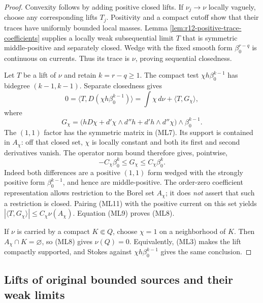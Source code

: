 \documentclass[11pt,a4paper]{article}
\numberwithin{equation}{section}
\theoremstyle{definition}
\theoremstyle{remark}
\begin{document}
\begin{proof}
Convexity follows by adding positive closed lifts.  If
$\nu_j\to\nu$ locally vaguely, choose any corresponding lifts
$T_j$.  Positivity and a compact cutoff show that their traces
have uniformly bounded local masses.  Lemma
\ref{lem:r12-positive-trace-coefficients} supplies a locally weak
subsequential limit $T$ that is symmetric middle-positive and
separately closed.  Wedge with the fixed smooth form
$\beta_0^{r-q}$ is continuous on currents.  Thus its trace is
$\nu$, proving sequential closedness.

Let $T$ be a lift of $\nu$ and retain $k=r-q\ge1$.
The compact test $\chi h\beta_0^{k-1}$ has bidegree
$(k-1,k-1)$.  Separate closedness gives
\[
 0=\langle T,D(\chi h\beta_0^{k-1})\rangle
   =\int\chi\,d\nu+\langle T,G_\chi\rangle,
 \tag{ML9}
\]
where
\[
 G_\chi=
 \bigl(hD\chi+d'\chi\wedge d''h+d'h\wedge d''\chi\bigr)
                         \wedge\beta_0^{k-1}.
 \tag{ML10}
\]
The $(1,1)$ factor has the symmetric matrix in \textup{(ML7)}.
Its support is contained in $A_\chi$: off that closed set, $\chi$
is locally constant and both its first and second derivatives
vanish.  The operator norm bound therefore gives, pointwise,
\[
            -C_\chi\beta_0^k\le G_\chi
                            \le C_\chi\beta_0^k.
 \tag{ML11}
\]
Indeed both differences are a positive $(1,1)$ form wedged with
the strongly positive form $\beta_0^{k-1}$, and hence are
middle-positive.  The order-zero coefficient representation
allows restriction to the Borel set $A_\chi$; it does \emph{not}
assert that such a restriction is closed.  Pairing \textup{(ML11)}
with the positive current on this set yields
$|\langle T,G_\chi\rangle|\le C_\chi\nu(A_\chi)$.
Equation \textup{(ML9)} proves \textup{(ML8)}.

If $\nu$ is carried by a compact $K\Subset Q$, choose $\chi=1$
on a neighborhood of $K$.  Then $A_\chi\cap K=\varnothing$,
so \textup{(ML8)} gives $\nu(Q)=0$.  Equivalently,
\textup{(ML3)} makes the lift compactly supported, and Stokes
against $\chi h\beta_0^{k-1}$ gives the same conclusion.
\end{proof}

\subsection{Lifts of original bounded sources and their weak limits}
\end{document}
